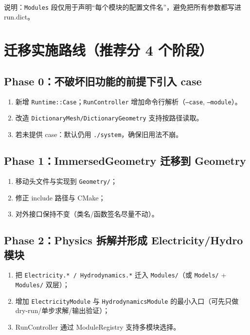 \documentclass[UTF8,a4paper,11pt]{ctexart}
\begin{document}
说明：\texttt{Modules} 段仅用于声明“每个模块的配置文件名”，避免把所有参数都写进 run.dict。

\section{迁移实施路线（推荐分 4 个阶段）}

\subsection{Phase 0：不破坏旧功能的前提下引入 case}
\begin{enumerate}[label=\arabic*)]
  \item 新增 \texttt{Runtime::Case}；\texttt{RunController} 增加命令行解析（\texttt{--case}, \texttt{--module}）。
  \item 改造 \texttt{DictionaryMesh/DictionaryGeometry} 支持按路径读取。
  \item 若未提供 case：默认仍用 \texttt{./system}，确保旧用法不崩。
\end{enumerate}

\subsection{Phase 1：ImmersedGeometry 迁移到 Geometry}
\begin{enumerate}[label=\arabic*)]
  \item 移动头文件与实现到 \texttt{Geometry/}；
  \item 修正 include 路径与 CMake；
  \item 对外接口保持不变（类名/函数签名尽量不动）。
\end{enumerate}

\subsection{Phase 2：Physics 拆解并形成 Electricity/Hydro 模块}
\begin{enumerate}[label=\arabic*)]
  \item 把 \texttt{Electricity.* / Hydrodynamics.*} 迁入 \texttt{Modules/}（或 \texttt{Models/} + \texttt{Modules/} 双层）；
  \item 增加 \texttt{ElectricityModule} 与 \texttt{HydrodynamicsModule} 的最小入口（可先只做 dry-run/单步求解/输出验证）；
  \item RunController 通过 ModuleRegistry 支持多模块选择。
\end{enumerate}
\end{document}
